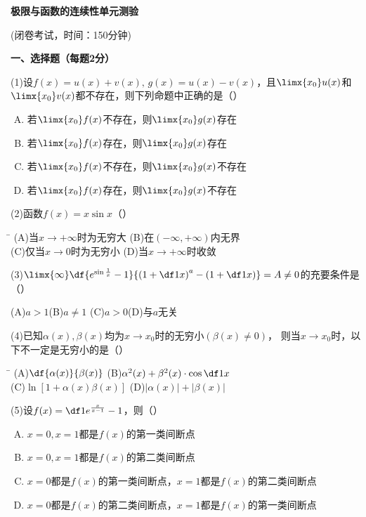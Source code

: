 \begin{center}
	{\Large\bf 极限与函数的连续性单元测验}
	
	(闭卷考试，时间：150分钟)
\end{center}

{\bf 一、选择题（每题2分）}

(1)\;设$f(x)=u(x)+v(x),\,g(x)=u(x)-v(x)$，且$\limx{x_0}u(x)$和
$\limx{x_0}v(x)$都不存在，则下列命题中正确的是（\quad）%
\begin{enumerate}[(A)]
  \setlength{\itemindent}{1cm}
  \item 若$\limx{x_0}f(x)$不存在，则$\limx{x_0}g(x)$存在
  \item 若$\limx{x_0}f(x)$存在，则$\limx{x_0}g(x)$存在
  \item 若$\limx{x_0}f(x)$不存在，则$\limx{x_0}g(x)$不存在
  \item 若$\limx{x_0}f(x)$存在，则$\limx{x_0}g(x)$不存在
\end{enumerate}

(2)\;函数$f(x)=x\sin x$（\quad）%
\begin{tabbing}
	\hspace{8cm}\=\kill
	\quad\quad\quad(A)\;当$x\to+\infty$时为无穷大 \> 
	(B)\;在$(-\infty,+\infty)$内无界 \\ 
	\quad\quad\quad(C)\;仅当$x\to0$时为无穷小\>
	(D)\;当$x\to+\infty$时收敛
\end{tabbing}

(3)\;$\limx{\infty}\df{e^{\sin\frac1x}-1}{\left(1+\df1x\right)^a
-\left(1+\df1x\right)}=A\ne 0$的充要条件是（\quad）%

\quad (A)\;$a>1$\quad\quad\quad(B)\;$a\ne 1$
\quad\quad\quad (C)\;$a>0$\quad\quad\quad(D)\;与$a$无关

(4)\;已知$\alpha(x),\beta(x)$均为$x\to x_0$时的无穷小$(\beta(x)\ne0)$，
则当$x\to x_0$时，以下不一定是无穷小的是（\quad）%

\begin{tabbing}
	\hspace{8cm}\=\kill
	\quad\quad\quad(A)\;$\df{\alpha(x)}{\beta(x)}$ \> 
	(B)\;$\alpha^2(x)+\beta^2(x)\cdot\cos\df1x$ \\ 
	\quad\quad\quad(C)\;$\ln[1+\alpha(x)\beta(x)]$\>
	(D)\;$|\alpha(x)|+|\beta(x)|$ 
\end{tabbing}

(5)\;设$f(x)=\df1{e^{\frac{x}{x-1}}-1}$，则（\quad）%
\begin{enumerate}[(A)]
  \setlength{\itemindent}{1cm}
  \item $x=0,x=1$都是$f(x)$的第一类间断点
  \item $x=0,x=1$都是$f(x)$的第二类间断点
  \item $x=0$都是$f(x)$的第一类间断点，$x=1$都是$f(x)$的第二类间断点
  \item $x=0$都是$f(x)$的第二类间断点，$x=1$都是$f(x)$的第一类间断点
\end{enumerate}

